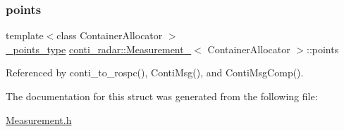 \subsubsection{\texorpdfstring{points}{points}}
{\footnotesize\ttfamily template$<$class Container\+Allocator $>$ \\
\hyperlink{structconti__radar_1_1Measurement___ad4384c3a255ac0bd1ba83addc0dafd71}{\+\_\+points\+\_\+type} \hyperlink{structconti__radar_1_1Measurement__}{conti\+\_\+radar\+::\+Measurement\+\_\+}$<$ Container\+Allocator $>$\+::points}



Referenced by conti\+\_\+to\+\_\+rospc(), Conti\+Msg(), and Conti\+Msg\+Comp().



The documentation for this struct was generated from the following file\+:\begin{DoxyCompactItemize}
\item 
\hyperlink{Measurement_8h}{Measurement.\+h}\end{DoxyCompactItemize}
